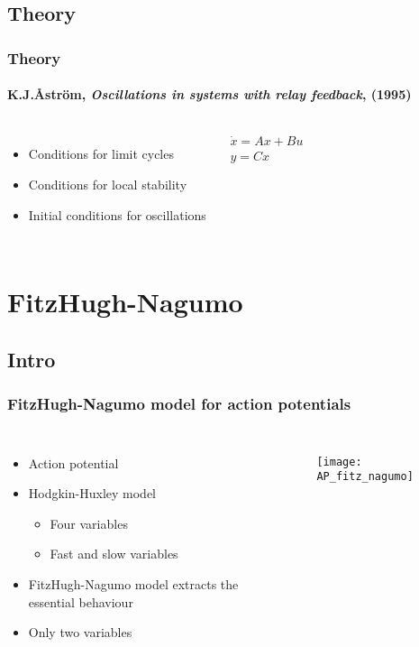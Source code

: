 \documentclass[11pt]{beamer}
\begin{document}
\subsection{Theory}
\begin{frame}
\frametitle{Theory}
\framesubtitle{K.J.\r{A}str\"{o}m, \emph{Oscillations in systems with relay feedback}, (1995)}
\begin{columns}[t,onlytextwidth]
	\begin{itemize}
    \item Conditions for limit cycles
    \item Conditions for local stability
	\item Initial conditions for oscillations
  \end{itemize}
\begin{eqnarray*}
\dot{x} = Ax + Bu \\
y = Cx 
\end{eqnarray*}

\end{columns}
\end{frame}

\section{FitzHugh-Nagumo}
\subsection{Intro}
\begin{frame}
\frametitle{FitzHugh-Nagumo model for action potentials}
\begin{columns}
\begin{itemize}
\item Action potential %
\item Hodgkin-Huxley model %
\begin{itemize}
\item Four variables
\item Fast and slow variables
\end{itemize}
\item FitzHugh-Nagumo model extracts the essential behaviour
\item Only two variables
\end{itemize}
\begin{figure}
\texttt{[image: AP\_fitz\_nagumo]}
\end{figure}
\end{columns}
\end{frame}
\end{document}
